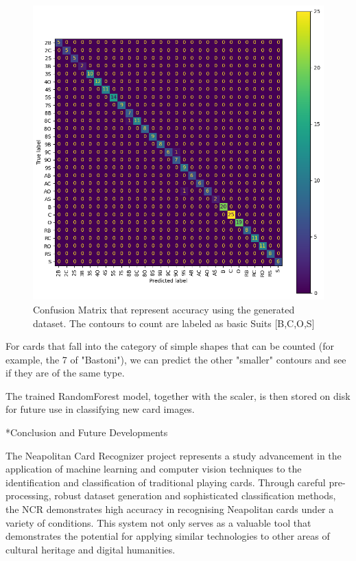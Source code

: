 \documentclass[twocolumn, a4paper,10pt]{article}
\makeatletter
\renewcommand\section{\@startsection{section}{1}{\z@}{3pt}{3pt}{\normalfont\large\bfseries}}
\makeatother
\begin{document}
\begin{figure}
  \centering
  \includegraphics[scale=0.4]{img/confusionMatrix.png}
  \caption{Confusion Matrix that represent accuracy using the generated dataset. The contours to count are labeled as basic Suits [B,C,O,S]}
  \label{fig:c_matrix}
\end{figure}

For cards that fall into the category of simple shapes that can be counted (for example, the 7 of "Bastoni"), we can predict the other "smaller" contours and see if they are of the same type.

The trained RandomForest model, together with the scaler, is then stored on disk for future use in classifying new card images.

\section*{Conclusion and Future Developments}

The Neapolitan Card Recognizer project represents a study advancement in the application of machine learning and computer vision techniques to the identification and classification of traditional playing cards. Through careful pre-processing, robust dataset generation and sophisticated classification methods, the NCR demonstrates high accuracy in recognising Neapolitan cards under a variety of conditions. This system not only serves as a valuable tool that demonstrates the potential for applying similar technologies to other areas of cultural heritage and digital humanities.
\end{document}
